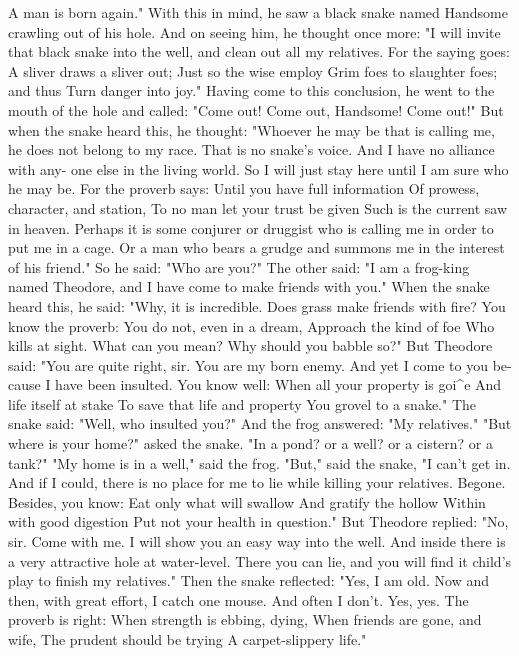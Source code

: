 \documentclass{book}
\begin{document}
A man is born again."
With this in mind, he saw a black snake named
Handsome crawling out of his hole. And on seeing
him, he thought once more: "I will invite that black
snake into the well, and clean out all my relatives.
For the saying goes:
A sliver draws a sliver out;
Just so the wise employ
Grim foes to slaughter foes; and thus
Turn danger into joy."
Having come to this conclusion, he went to the
mouth of the hole and called: "Come out! Come
out, Handsome! Come out!" But when the snake
heard this, he thought: "Whoever he may be that
is calling me, he does not belong to my race. That is
no snake's voice. And I have no alliance with any-
one else in the living world. So I will just stay here
until I am sure who he may be. For the proverb
says:
Until you have full information
Of prowess, character, and station,
To no man let your trust be given
Such is the current saw in heaven.
Perhaps it is some conjurer or druggist who is calling
me in order to put me in a cage. Or a man who bears
a grudge and summons me in the interest of his
friend."
So he said: "Who are you?" The other said: "I
am a frog-king named Theodore, and I have come
to make friends with you."
When the snake heard this, he said: "Why, it is
incredible. Does grass make friends with fire? You
know the proverb:
You do not, even in a dream,
Approach the kind of foe
Who kills at sight. What can you mean?
Why should you babble so?"
But Theodore said: "You are quite right, sir.
You are my born enemy. And yet I come to you be-
cause I have been insulted. You know well:
When all your property is goi^e
And life itself at stake
To save that life and property
You grovel to a snake."
The snake said: "Well, who insulted you?" And
the frog answered: "My relatives." "But where is
your home?" asked the snake. "In a pond? or a
well? or a cistern? or a tank?" "My home is in a
well," said the frog. "But," said the snake, "I can't
get in. And if I could, there is no place for me to lie
while killing your relatives. Begone. Besides, you
know:
Eat only what will swallow
And gratify the hollow
Within with good digestion
Put not your health in question."
But Theodore replied: "No, sir. Come with me.
I will show you an easy way into the well. And inside
there is a very attractive hole at water-level. There
you can lie, and you will find it child's play to finish
my relatives."
Then the snake reflected: "Yes, I am old. Now
and then, with great effort, I catch one mouse. And
often I don't. Yes, yes. The proverb is right:
When strength is ebbing, dying,
When friends are gone, and wife,
The prudent should be trying
A carpet-slippery life."
\end{document}
